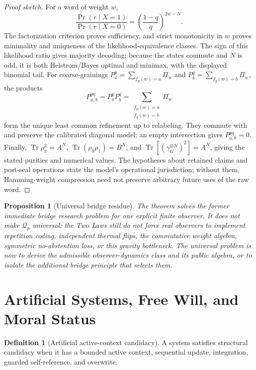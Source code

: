 \documentclass[11pt]{article}
\theoremstyle{plain}
\newtheorem{proposition}[theorem]{Proposition}
\theoremstyle{definition}
\newtheorem{definition}[theorem]{Definition}
\theoremstyle{remark}
\newenvironment{proofsketch}{\begin{proof}[Proof sketch]}{\end{proof}}
\begin{document}
\begin{proofsketch}
For a word of weight \(w\),
\[
\frac{\Pr(r\mid X=1)}{\Pr(r\mid X=0)}
=
\left(\frac{1-q}{q}\right)^{2w-N}.
\]
The factorization criterion proves sufficiency, and strict monotonicity in \(w\) proves minimality and uniqueness of the likelihood-equivalence classes. The sign of this likelihood ratio gives majority decoding; because the states commute and \(N\) is odd, it is both Helstrom/Bayes optimal and minimax, with the displayed binomial tail. For coarse-grainings \(P^p_a=\sum_{f_p(w)=a}\Pi_w\) and \(P^q_b=\sum_{f_q(w)=b}\Pi_w\), the products
\[
P^{pq}_{a,b}=P^p_aP^q_b
=
\sum_{\substack{f_p(w)=a\\f_q(w)=b}}\Pi_w
\]
form the unique least common refinement up to relabeling. They commute with and preserve the calibrated diagonal model; an empty intersection gives \(P^{pq}_{a,b}=0\). Finally, \(\operatorname{Tr}\rho_x^2=A^N\), \(\operatorname{Tr}(\rho_0\rho_1)=B^N\), and \(\operatorname{Tr}[(\gamma_G^{\otimes N})^2]=A^N\), giving the stated purities and numerical values. The hypotheses about retained claims and post-seal operations state the model's operational jurisdiction; without them, Hamming-weight compression need not preserve arbitrary future uses of the raw word.
\end{proofsketch}

\begin{proposition}[Universal bridge residue]
The theorem solves the former immediate bridge research problem for one explicit finite observer. It does not make \(\mathcal Q_p\) universal: the Two Laws still do not force real observers to implement repetition coding, independent thermal flips, the commutative weight algebra, symmetric no-abstention loss, or this gravity bottleneck. The universal problem is now to derive the admissible observer-dynamics class and its public algebra, or to isolate the additional bridge principle that selects them.
\end{proposition}

\section{Artificial Systems, Free Will, and Moral Status}

\begin{definition}[Artificial active-context candidacy]
A system satisfies structural candidacy when it has a bounded active context, sequential update, integration, guarded self-reference, and overwrite.
\end{definition}
\end{document}
